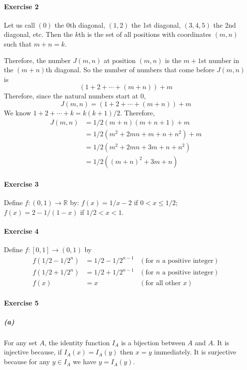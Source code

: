 \documentclass{report}
\begin{document}
    \paragraph{Exercise 2}
    Let us call $(0)$ the $0$th diagonal, $(1,2)$ the 1st diagonal, $(3,4,5)$ the 2nd diagonal, etc.
    Then the $k$th is the set of all positions with coordinates $(m,n)$ such that $m + n = k$.

    Therefore, the number $J(m,n)$ at position $(m,n)$ is the $m+1$st number in the $(m+n)$th diagonal. So the number
    of numbers that come before $J(m,n)$ is
    \[ (1 + 2 + \cdots + (m+n)) + m \]
    Therefore, since the natural numbers start at 0,
    \[ J(m,n) = (1 + 2 + \cdots + (m+n)) + m \]
    We know $1 + 2 + \cdots + k = k(k+1)/2$. Therefore,
    \begin{align*}
        J(m,n) & = 1/2(m+n)(m+n+1) + m \\
        & = 1/2(m^2 + 2mn + m + n + n^2) + m \\
        & = 1/2(m^2 + 2mn + 3m + n + n^2) \\
        & = 1/2((m+n)^2 + 3m + n)
    \end{align*}

    \paragraph{Exercise 3}
    Define $f : (0,1) \rightarrow \mathbb{R}$ by: $f(x) = 1/x - 2$ if $0 < x \leq 1/2$; $f(x) = 2 - 1/(1-x)$
    if $1/2 < x < 1$.

    \paragraph{Exercise 4}
    Define $f : [0,1] \rightarrow (0,1)$ by 
    \begin{align*}
        f(1/2 - 1/2^n) & = 1/2 - 1/2^{n-1} & (\text{for $n$ a positive integer}) \\
        f(1/2 + 1/2^n) & = 1/2 + 1/2^{n-1} & (\text{for $n$ a positive integer}) \\
        f(x) & = x & (\text{for all other $x$})
    \end{align*}

    \paragraph{Exercise 5}
    \subparagraph{(a)}
    For any set $A$, the identity function $I_A$ is a bijection between $A$ and $A$. It is injective
    because, if $I_A(x) = I_A(y)$ then $x = y$ immediately. It is surjective because for any $y \in I_A$
    we have $y = I_A(y)$.
    
\end{document}
